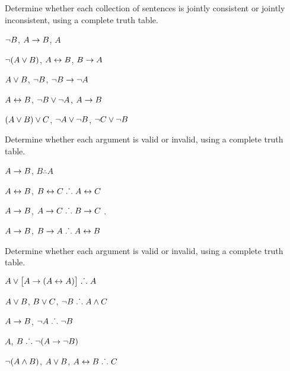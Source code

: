 \noindent\problempart
\label{pr.TT.consistent3}
Determine whether each collection of sentences is jointly consistent or jointly inconsistent, using a complete truth table. 
\begin{earg}
\item $\neg B$, $A \rightarrow B$, $A$ \vspace{.5ex} \hfill {}
\item $\neg(A \vee B)$, $A \leftrightarrow B$, $B \rightarrow A$\vspace{.5ex} \hfill {}
\item $A \vee B$, $\neg B$, $\neg B \rightarrow \neg A$\vspace{.5ex} \hfill {}
\item $A \leftrightarrow B$, $\neg B \vee \neg A$, $A \rightarrow B$\vspace{.5ex} \hfill {} 
\item $(A \vee B) \vee C$, $\neg A \vee \neg B$, $\neg C \vee \neg B$\vspace{.5ex} \hfill {}
\end{earg}

\noindent\problempart
\label{pr.TT.valid2}
Determine whether each argument is valid or invalid, using a complete truth table. 
\begin{earg}
\item $A\rightarrow B$, $B \therefore  A$ \hfill {}

\item $A\leftrightarrow B$, $B\leftrightarrow C \mathrel{\ldotp\dot{}\,\ldotp} A\leftrightarrow C$ \hfill {}

\item $A \rightarrow B$, $A \rightarrow C\mathrel{\ldotp\dot{}\,\ldotp} B \rightarrow C$ \hfill {}. 

\item $A \rightarrow B$, $B \rightarrow A\mathrel{\ldotp\dot{}\,\ldotp} A \leftrightarrow B$ \hfill {} 
\end{earg}

\noindent\problempart
\label{pr.TT.valid3}
Determine whether each argument is valid or invalid, using a complete truth table. 
\begin{earg}
\item $A\vee\bigl[A\rightarrow(A\leftrightarrow A)\bigr] \mathrel{\ldotp\dot{}\,\ldotp}  A $\vspace{.5ex} \hfill {}
\item $A\vee B$, $B\vee C$, $\neg B \mathrel{\ldotp\dot{}\,\ldotp} A \wedge C$\vspace{.5ex} \hfill {}
\item $A \rightarrow B$, $\neg A\mathrel{\ldotp\dot{}\,\ldotp} \neg B$ \vspace{.5ex} \hfill {}
\item $A$, $B\mathrel{\ldotp\dot{}\,\ldotp} \neg(A\rightarrow \neg B)$ \vspace{.5ex} \hfill {}
\item $\neg(A \wedge B)$, $A \vee B$, $A \leftrightarrow B\mathrel{\ldotp\dot{}\,\ldotp} C$ \vspace{.5ex} \hfill {}
\end{earg}

